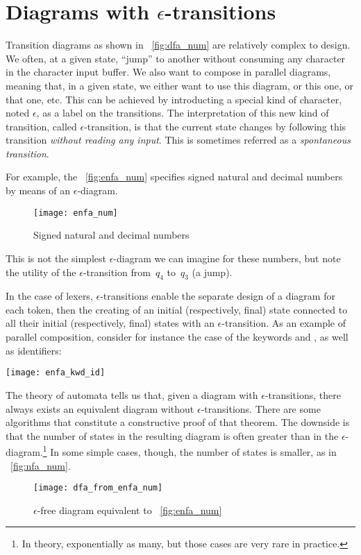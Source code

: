 \section{Diagrams with \(\epsilon\)-transitions}

Transition diagrams as shown in \fig~\vref{fig:dfa_num} are relatively
complex to design. We often, at a given state, ``jump'' to another
without consuming any character in the character input buffer. We also
want to compose in parallel diagrams, meaning that, in a given state,
we either want to use this diagram, or this one, or that one,
etc. This can be achieved by introducting a special kind of character,
noted \(\epsilon\), as a label on the transitions. The interpretation
of this new kind of transition, called \(\epsilon\)-transition, is
that the current state changes by following this transition
\emph{without reading any input}. This is sometimes referred as a
\emph{spontaneous transition}.

For example, the \fig~\vref{fig:enfa_num} specifies signed natural and
decimal numbers by means of an \(\epsilon\)-diagram.
\begin{figure}
\centering
\texttt{[image: enfa\_num]}
\caption{Signed natural and decimal numbers\label{fig:enfa_num}}
\end{figure}
This is not the simplest \(\epsilon\)-diagram we can imagine for these
numbers, but note the utility of the \(\epsilon\)-transition
from~\(q_4\) to~\(q_3\) (a jump).

In the case of lexers, \(\epsilon\)-transitions enable the separate
design of a diagram for each token, then the creating of an initial
(respectively, final) state connected to all their initial
(respectively, final) states with an \(\epsilon\)-transition.  As an
example of parallel composition, consider for instance the case of the
keywords  and , as well as identifiers:
\begin{center}
\texttt{[image: enfa\_kwd\_id]}
\end{center}



The theory of automata tells us that, given a diagram with
\(\epsilon\)-transitions, there always exists an equivalent diagram
without \(\epsilon\)-transitions. There are some algorithms that
constitute a constructive proof of that theorem. The downside is that
the number of states in the resulting diagram is often greater than in
the \(\epsilon\)-diagram.\footnote{In theory, exponentially as many,
  but those cases are very rare in practice.} In some simple cases,
though, the number of states is smaller, as in
\fig~\vref{fig:nfa_num}.
\begin{figure}
\centering
\texttt{[image: dfa\_from\_enfa\_num]}
\caption{\(\epsilon\)-free diagram equivalent to \fig~\vref{fig:enfa_num}
\label{fig:nfa_num}}
\end{figure}


